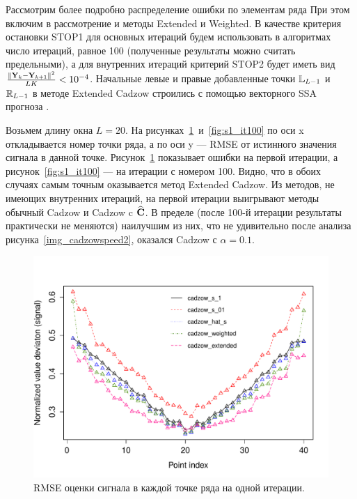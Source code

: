 \documentclass[12pt,a4paper,fleqn,leqno]{article}
\begin{document}
Рассмотрим более подробно распределение ошибки по элементам ряда При этом включим в рассмотрение и
методы Extended и Weighted.
В качестве критерия остановки STOP1 для основных итераций будем использовать в алгоритмах число итераций, равное 100 (полученные результаты
можно считать предельными), а для внутренних итераций критерий STOP2 будет иметь вид $\frac{\|\mathbf{Y}_k - \mathbf{Y}_{k+1}\|^2}{LK} < 10^{-4}$.
Начальные левые и правые добавленные точки $\mathbb{L}_{L-1}$ и $\mathbb{R}_{L-1}$
в методе Extended Cadzow строились с помощью векторного SSA прогноза \cite[раздел 2.3.1]{Golyandina.etal2001}.

Возьмем длину окна $L=20$.  На рисунках~\ref{fig:s1_it1}~и~\ref{fig:s1_it100} по оси x откладывается номер точки ряда,
а по оси y --- RMSE от истинного значения сигнала в данной точке. Рисунок~\ref{fig:s1_it1} показывает ошибки на первой итерации,
а рисунок~\ref{fig:s1_it100} --- на итерации с номером 100.
Видно, что в обоих случаях самым точным оказывается метод Extended Cadzow. Из методов, не имеющих внутренних итераций,
на первой итерации выигрывают методы обычный Cadzow и Cadzow c $\widehat{\mathbf{C}}$. В пределе (после 100-й итерации результаты практически не меняются)
наилучшим из них, что не удивительно после анализа рисунка~\ref{img_cadzowspeed2}, оказался Cadzow с $\alpha=0.1$.

\begin{figure}[!hhh]
\begin{center}
\includegraphics[width = 13cm]{s1_it1.pdf}
\caption{RMSE оценки сигнала в каждой точке ряда на одной итерации.}
\label{fig:s1_it1}
\end{center}
\end{figure}
\end{document}
